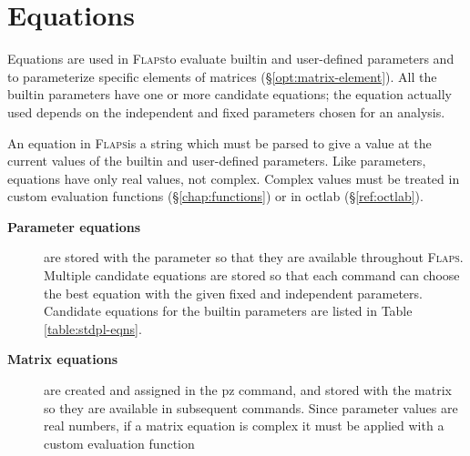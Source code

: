 \documentclass[11pt,openany,twoside]{book}
\numberwithin{equation}{section}		%
\newcommand{\Cmd}[1]{{\sf #1}}
\newcommand{\Newterm}[1]{{\em #1}}	%
\newcommand{\Flaps}{\textsc{Flaps\:}}
\newcommand{\Sectref}[1]{\S\ref{#1}}
\newcommand{\Tableref}[1]{Table \ref{#1}}
\begin{document}
\chapter{Equations}\label{chap:equations}
Equations are used in \Flaps to evaluate builtin and user-defined parameters
and to parameterize specific elements of matrices (\Sectref{opt:matrix-element}).
All the builtin parameters have one or more candidate equations; the equation actually
used depends on the independent and fixed parameters chosen for an analysis.

An equation in \Flaps is a string which must be parsed to
give a value at the current values of the builtin and user-defined
parameters. Like parameters, equations have only real values, not
complex. Complex values must be treated in custom evaluation functions
(\Sectref{chap:functions}) or in \Cmd{octlab}
(\Sectref{ref:octlab}).

\begin{description}
\item[{\bf Parameter equations}] are stored with the parameter
so that they are available throughout \Flaps. Multiple candidate
equations are stored so that each command can choose the best
equation with the given fixed and independent parameters.
Candidate equations for the builtin parameters are
listed in \Tableref{table:stdpl-eqns}.
\item[{\bf Matrix equations}] are created and assigned in the \Cmd{pz} command,
and stored with the matrix so they are available in subsequent commands.
Since parameter values are real numbers, if a matrix equation is
complex it must be applied with a custom evaluation function
\end{description}

\end{document}
